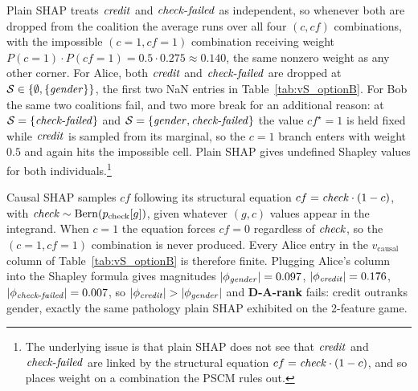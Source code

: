 Plain SHAP treats $\varname{credit}$ and $\varname{check\text{-}failed}$ as
independent, so whenever both are dropped from the coalition the average runs
over all four $(c, cf)$ combinations, with the impossible $(c{=}1, cf{=}1)$
combination receiving weight
$P(c{=}1)\cdot P(cf{=}1) = 0.5\cdot 0.275 \approx 0.140$,
the same nonzero weight as any other corner. For Alice, both $\varname{credit}$ and
$\varname{check\text{-}failed}$ are dropped at $\mathcal{S}\in\{\emptyset,\{\varname{gender}\}\}$,
the first two NaN
entries in Table~\ref{tab:vS_optionB}. For Bob the same two coalitions fail,
and two more break for an additional reason: at
$\mathcal{S}=\{\varname{check\text{-}failed}\}$ and
$\mathcal{S}=\{\varname{gender},\varname{check\text{-}failed}\}$ the value $cf^\star=1$
is held fixed while $\varname{credit}$ is sampled from its marginal, so the $c{=}1$ branch
enters with weight $0.5$ and again hits the impossible cell. Plain SHAP gives
undefined Shapley values for both individuals.\footnote{The underlying issue
is that plain SHAP does not see that $\varname{credit}$ and
$\varname{check\text{-}failed}$ are linked by the structural equation
$cf = \varname{check}\cdot(1 - c)$, and so places weight on a combination
the PSCM rules out.}

Causal SHAP samples $cf$ following its structural equation
$cf = \varname{check}\cdot(1 - c)$, with $\varname{check}\sim\mathrm{Bern}(p_\text{check}[g])$,
given whatever $(g, c)$ values appear in the integrand. When $c=1$ the
equation forces $cf=0$ regardless of $\varname{check}$, so the
$(c{=}1, cf{=}1)$ combination is never produced. Every Alice entry in the
$v_\mathrm{causal}$ column of Table~\ref{tab:vS_optionB} is therefore finite.
Plugging Alice's column into the Shapley formula gives magnitudes
$|\phi_{\varname{gender}}|=0.097$, $|\phi_{\varname{credit}}|=0.176$,
$|\phi_{\varname{check\text{-}failed}}|=0.007$, so
$|\phi_{\varname{credit}}|>|\phi_{\varname{gender}}|$ and \textbf{D-A-rank}
fails: credit outranks gender, exactly the same pathology plain SHAP exhibited
on the 2-feature game.

